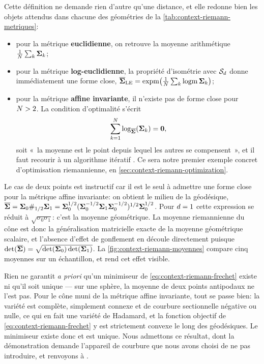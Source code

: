 Cette définition ne demande rien d'autre qu'une distance, et elle redonne bien les objets attendus dans chacune des géométries de la \cref{tab:context-riemann-metriques}:
\begin{itemize}
  \item pour la métrique \textbf{euclidienne}, on retrouve la moyenne arithmétique $\frac{1}{N}\sum_k\boldsymbol{\Sigma}_k$;
  \item pour la métrique \textbf{log-euclidienne}, la propriété d'isométrie avec $\mathcal{S}_{d}$ donne immédiatement une forme close, $\overline{\boldsymbol{\Sigma}}_{\mathrm{LE}}=\operatorname{\operatorname{expm}}\!\left(\frac{1}{N}\sum_k\operatorname{\operatorname{logm}}\boldsymbol{\Sigma}_k\right)$;
  \item pour la métrique \textbf{affine invariante}, il n'existe pas de forme close pour $N>2$. La condition d'optimalité s'écrit
  \begin{equation}
    \sum_{k=1}^{N}\log_{\overline{\boldsymbol{\Sigma}}}(\boldsymbol{\Sigma}_k) = \boldsymbol{0},
    \label{eq:context-riemann-frechetopt}
  \end{equation}
  soit «~la moyenne est le point depuis lequel les autres se compensent~», et il faut recourir à un algorithme itératif . Ce sera notre premier exemple concret d'optimisation riemannienne, en \cref{sec:context-riemann-optimization}.
\end{itemize}

Le cas de deux points est instructif car il est le seul à admettre une forme close pour la métrique affine invariante: on obtient le milieu de la géodésique, $\overline{\boldsymbol{\Sigma}}=\boldsymbol{\Sigma}_0\#_{1/2}\boldsymbol{\Sigma}_1=\boldsymbol{\Sigma}_0^{1/2}(\boldsymbol{\Sigma}_0^{-1/2}\boldsymbol{\Sigma}_1\boldsymbol{\Sigma}_0^{-1/2})^{1/2}\boldsymbol{\Sigma}_0^{1/2}$. Pour $d=1$ cette expression se réduit à $\sqrt{\sigma_0\sigma_1}$: c'est la moyenne géométrique. La moyenne riemannienne du cône est donc la généralisation matricielle exacte de la moyenne géométrique scalaire, et l'absence d'effet de gonflement en découle directement puisque $\operatorname{\operatorname{det}}(\overline{\boldsymbol{\Sigma}})=\sqrt{\operatorname{\operatorname{det}}(\boldsymbol{\Sigma}_0)\operatorname{\operatorname{det}}(\boldsymbol{\Sigma}_1)}$. La \cref{fig:context-riemann-moyennes} compare cinq moyennes sur un échantillon, et rend cet effet visible.

\begin{remark}
  Rien ne garantit \emph{a priori} qu'un minimiseur de \cref{eq:context-riemann-frechet} existe ni qu'il soit unique --- sur une sphère, la moyenne de deux points antipodaux ne l'est pas. Pour le cône muni de la métrique affine invariante, tout se passe bien: la variété est complète, simplement connexe et de courbure sectionnelle négative ou nulle, ce qui en fait une variété de Hadamard, et la fonction objectif de \cref{eq:context-riemann-frechet} y est strictement convexe le long des géodésiques. Le minimiseur existe donc et est unique. Nous admettons ce résultat, dont la démonstration demande l'appareil de courbure que nous avons choisi de ne pas introduire, et renvoyons à .
\end{remark}

